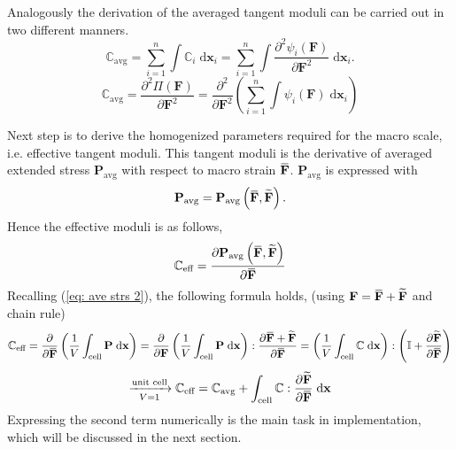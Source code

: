 \documentclass[10pt,a4paper]{scrreprt}
\newcommand{\myd}{\;\mathrm{d}}
\newcommand{\overbar}[1]{\mkern 1.5mu\overline{\mkern-1.5mu#1\mkern-1.5mu}\mkern 1.5mu}
\begin{document}
Analogously the derivation of the averaged tangent moduli can be carried out in two different manners. 
\begin{equation}
\label{eq: tan mod}
\mathbb{C}_{\text{avg}} = \sum^{n}_{i=1} \int \mathbb{C}_{i} \myd{\mathbf{x}_{i}} = \sum^{n}_{i=1} \int \dfrac{\partial^{2} \psi_{i}(\mathbf{F})}{\partial \mathbf{F}^{2}} \myd{\mathbf{x}_{i}}.
\end{equation}
\begin{equation}
\label{eq: tan mod 2}
\mathbb{C}_{\text{avg}} = \dfrac{\partial^{2} \Pi(\mathbf{F})}{\partial \mathbf{F}^{2}} = \dfrac{\partial^{2}}{\partial \mathbf{F}^{2}} \left( \sum^{n}_{i=1} \int \psi_{i}(\mathbf{F}) \myd{\mathbf{x}_{i}} \right)
\end{equation}

Next step is to derive the homogenized parameters required for the macro scale, i.e. effective tangent moduli. This tangent moduli is the derivative of averaged extended stress $\mathbf{P}_{\text{avg}}$ with respect to macro strain $\overbar{\mathbf{F}}$. $\mathbf{P}_{\text{avg}}$ is expressed with 
\begin{equation}
\mathbf{P}_{\text{avg}} = \mathbf{P}_{\text{avg}} \left( \overbar{\mathbf{F}}, \widetilde{\mathbf{F}} \right).
\end{equation}
Hence the effective moduli is as follows,
\begin{equation}
\mathbb{C}_{\text{eff}} = \dfrac{\partial \mathbf{P}_{\text{avg}} \left( \overbar{\mathbf{F}}, \widetilde{\mathbf{F}} \right)}{\partial \overbar{\mathbf{F}}}
\end{equation}
Recalling (\ref{eq: ave strs 2}), the following formula holds, (using $\mathbf{F} = \overbar{\mathbf{F}} + \widetilde{\mathbf{F}}$ and chain rule)
\[
\mathbb{C}_{\text{eff}} = \dfrac{\partial}{\partial \overbar{\mathbf{F}}} \left( \dfrac{1}{V} \int_{\text{cell}} \mathbf{P} \myd{\mathbf{x}} \right) = \dfrac{\partial}{\partial \mathbf{F}} \left( \dfrac{1}{V} \int_{\text{cell}} \mathbf{P} \myd{\mathbf{x}} \right) : \dfrac{\partial \overbar{\mathbf{F}} + \widetilde{\mathbf{F}}}{\partial \overbar{\mathbf{F}}} =  \left( \dfrac{1}{V} \int_{\text{cell}}  \mathbb{C} \myd{\mathbf{x}} \right) : \left( \mathbb{I} + \dfrac{\partial \widetilde{\mathbf{F}}}{\partial \overbar{\mathbf{F}}} \right)
\]
\begin{equation}
\label{eq: c eff}
\xrightarrow[ V = 1]{\text{unit cell}} \mathbb{C}_{\text{eff}} = \mathbb{C}_{\text{avg}} + \int_{\text{cell}}  \mathbb{C} : \dfrac{\partial \widetilde{\mathbf{F}}}{\partial \overbar{\mathbf{F}}} \myd{\mathbf{x}} 
\end{equation}
Expressing the second term numerically is the main task in implementation, which will be discussed in the next section.
\end{document}
